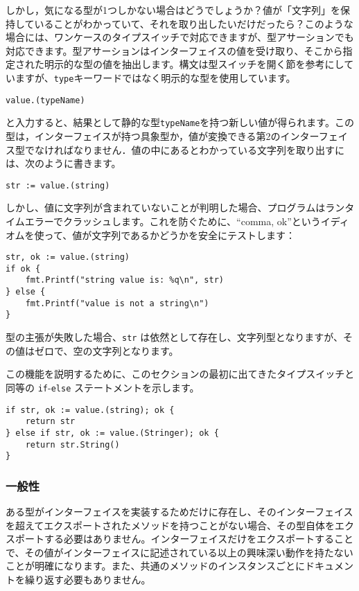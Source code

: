 \documentclass{jsarticle}
\begin{document}
しかし，気になる型が1つしかない場合はどうでしょうか？値が「文字列」を保持していることがわかっていて、それを取り出したいだけだったら？このような場合には、ワンケースのタイプスイッチで対応できますが、型アサーションでも対応できます。型アサーションはインターフェイスの値を受け取り、そこから指定された明示的な型の値を抽出します。構文は型スイッチを開く節を参考にしていますが、\texttt{type}キーワードではなく明示的な型を使用しています。

\begin{lstlisting}[numbers=none]
value.(typeName)
\end{lstlisting}

と入力すると、結果として静的な型\texttt{typeName}を持つ新しい値が得られます。この型は，インターフェイスが持つ具象型か，値が変換できる第2のインターフェイス型でなければなりません．値の中にあるとわかっている文字列を取り出すには、次のように書きます。

\begin{lstlisting}[numbers=none]
str := value.(string)
\end{lstlisting}

しかし、値に文字列が含まれていないことが判明した場合、プログラムはランタイムエラーでクラッシュします。これを防ぐために、``comma,
ok''というイディオムを使って、値が文字列であるかどうかを安全にテストします：

\begin{lstlisting}[numbers=none]
str, ok := value.(string)
if ok {
    fmt.Printf("string value is: %q\n", str)
} else {
    fmt.Printf("value is not a string\n")
}
\end{lstlisting}

型の主張が失敗した場合、\texttt{str}
は依然として存在し、文字列型となりますが、その値はゼロで、空の文字列となります。

この機能を説明するために、このセクションの最初に出てきたタイプスイッチと同等の
\texttt{if}-\texttt{else} ステートメントを示します。

\begin{lstlisting}[numbers=none]
if str, ok := value.(string); ok {
    return str
} else if str, ok := value.(Stringer); ok {
    return str.String()
}
\end{lstlisting}

\subsubsection{一般性}

ある型がインターフェイスを実装するためだけに存在し、そのインターフェイスを超えてエクスポートされたメソッドを持つことがない場合、その型自体をエクスポートする必要はありません。インターフェイスだけをエクスポートすることで、その値がインターフェイスに記述されている以上の興味深い動作を持たないことが明確になります。また、共通のメソッドのインスタンスごとにドキュメントを繰り返す必要もありません。
\end{document}
